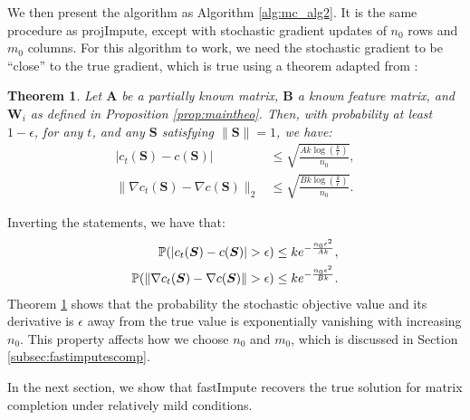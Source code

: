 \documentclass[twoside,11pt]{article}
\renewcommand{\P}{\mathbb{P}}
\newtheorem{theo}{Theorem}
\renewcommand{\P}{\mathbb{P}}
\begin{document}
We then present the algorithm as Algorithm \ref{alg:mc_alg2}.
It is the same procedure as projImpute, except with stochastic gradient updates of $n_0$ rows and $m_0$ columns. 
For this algorithm to work, we  need the stochastic gradient to be ``close'' to the true gradient, which is true using a theorem adapted from \cite{bertsimas2018interpretable}:
\begin{theo}
\label{theo:gradapprox}
    Let $\bm{A}$ be a partially known matrix, $\bm{B}$ a known feature matrix, and $\bm{W}_i$ as defined in Proposition \ref{prop:maintheo}. Then, with probability at least $1-\epsilon$, for any $t$, and any $\bm{S}$ satisfying $\|\bm{S}\|=1$, we have:
    \begin{align*}
        |c_t(\bm{S})-c(\bm{S})|&\leq \sqrt{\frac{Ak\log\left(\frac{k}{\epsilon}\right)}{n_0}} ,\\
                \|\nabla c_t(\bm{S})-\nabla c(\bm{S})\|_2&\leq \sqrt{\frac{Bk\log\left(\frac{k}{\epsilon}\right)}{n_0}}.
    \end{align*}
\end{theo}
Inverting the statements, we have that:
\begin{align*}
    \P(|c_t(\bm{S})-c(\bm{S})|>\epsilon)&\leq ke^{-\frac{n_0\epsilon^2}{Ak}}, \vspace{3pt}\\
   \P(\|\nabla c_t(\bm{S})-\nabla c(\bm{S})\|>\epsilon)&\leq ke^{-\frac{n_0\epsilon^2}{Bk}}    .
\end{align*}
Theorem \ref{theo:gradapprox}   shows that the probability the stochastic objective value and its derivative  is $\epsilon$ away from the true value is exponentially vanishing with increasing $n_0$. 
This  property   affects how we choose $n_0$ and $m_0$, which is discussed in Section \ref{subsec:fastimputescomp}. 

In the next  section, we   show that  fastImpute 
 recovers the true solution for matrix completion under relatively mild conditions. 
\end{document}

